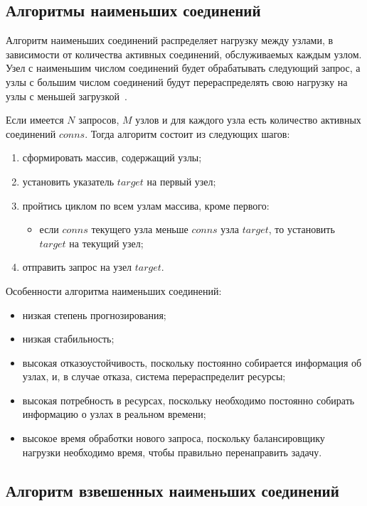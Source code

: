 \subsection{Алгоритмы наименьших соединений}

Алгоритм наименьших соединений распределяет нагрузку между узлами, в зависимости от количества активных соединений, обслуживаемых каждым узлом.
Узел с наименьшим числом соединений будет обрабатывать следующий запрос, а узлы с большим числом соединений будут перераспределять свою нагрузку на узлы с меньшей загрузкой~\cite{leastconnection}.

Если имеется $N$ запросов, $M$ узлов и для каждого узла есть количество активных соединений $conns$. 
Тогда алгоритм состоит из следующих шагов:
\begin{enumerate}
	\item сформировать массив, содержащий узлы;
	\item установить указатель $target$ на первый узел;
	\item пройтись циклом по всем узлам массива, кроме первого:
	\begin{itemize}
		\item если $conns$ текущего узла меньше $conns$ узла $target$, то установить $target$ на текущий узел; 
	\end{itemize}
	\item отправить запрос на узел $target$.
\end{enumerate}

Особенности алгоритма наименьших соединений:
\begin{itemize}
	\item низкая степень прогнозирования; 
	\item низкая стабильность;
	\item высокая отказоустойчивость, поскольку постоянно собирается информация об узлах, и, в случае отказа, система перераспределит ресурсы;
	\item высокая потребность в ресурсах, поскольку необходимо постоянно собирать информацию о узлах в реальном времени;
	\item высокое время обработки нового запроса, поскольку балансировщику нагрузки необходимо время, чтобы правильно перенаправить задачу.
\end{itemize}

\subsection*{Алгоритм взвешенных наименьших соединений}

